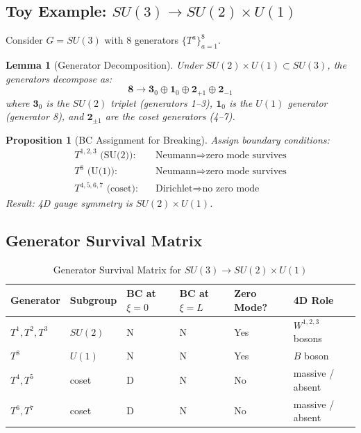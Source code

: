\documentclass[11pt,a4paper]{article}
\newtheorem{lemma}[theorem]{Lemma}
\newtheorem{proposition}[theorem]{Proposition}
\begin{document}
\subsection{Toy Example: $SU(3) \to SU(2) \times U(1)$}

Consider $G = SU(3)$ with 8 generators $\{T^a\}_{a=1}^8$.

\begin{lemma}[Generator Decomposition]
\label{lem:su3-decomp}
Under $SU(2) \times U(1) \subset SU(3)$, the generators decompose as:
\begin{equation}
  \mathbf{8} \to \mathbf{3}_0 \oplus \mathbf{1}_0 \oplus \mathbf{2}_{+1} \oplus \mathbf{2}_{-1}
  \label{eq:su3-decomp}
\end{equation}
where $\mathbf{3}_0$ is the $SU(2)$ triplet (generators 1--3), $\mathbf{1}_0$
is the $U(1)$ generator (generator 8), and $\mathbf{2}_{\pm 1}$ are the
coset generators (4--7).
\end{lemma}

\begin{proposition}[BC Assignment for Breaking]
\label{prop:bc-breaking-su3}
Assign boundary conditions:
\begin{align}
  T^{1,2,3} \text{ (SU(2)):} & \quad \text{Neumann} \Rightarrow \text{zero mode survives}
  \label{eq:bc-su2} \\
  T^8 \text{ (U(1)):} & \quad \text{Neumann} \Rightarrow \text{zero mode survives}
  \label{eq:bc-u1} \\
  T^{4,5,6,7} \text{ (coset):} & \quad \text{Dirichlet} \Rightarrow \text{no zero mode}
  \label{eq:bc-coset}
\end{align}
Result: 4D gauge symmetry is $SU(2) \times U(1)$.
\end{proposition}

\subsection{Generator Survival Matrix}

\begin{table}[h]
\centering
\caption{Generator Survival Matrix for $SU(3) \to SU(2) \times U(1)$}
\label{tab:generator-survival}
\begin{tabular}{llllll}
\toprule
Generator & Subgroup & BC at $\xi=0$ & BC at $\xi=L$ & Zero Mode? & 4D Role \\
\midrule
$T^1, T^2, T^3$ & $SU(2)$ & N & N & Yes & $W^{1,2,3}$ bosons \\
$T^8$ & $U(1)$ & N & N & Yes & $B$ boson \\
$T^4, T^5$ & coset & D & N & No & massive / absent \\
$T^6, T^7$ & coset & D & N & No & massive / absent \\
\bottomrule
\end{tabular}
\end{table}
\end{document}

